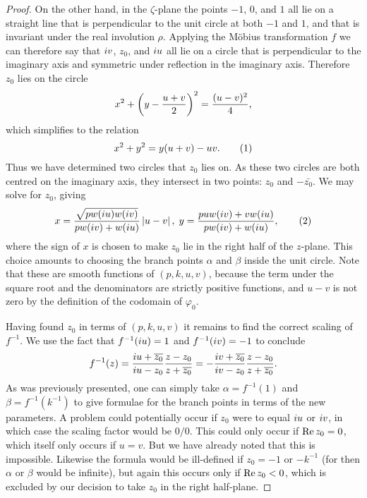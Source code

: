\begin{lem}
\begin{proof}
On the other hand, in the $ζ$-plane the points $-1$, $0$, and $1$ all lie on a straight line that is perpendicular to the unit circle at both $-1$ and $1$, and that is invariant under the real involution $ρ$. Applying the Möbius transformation $f$ we can therefore say that $i v$, $z_0$, and $i u$ all lie on a circle that is perpendicular to the imaginary axis and symmetric under reflection in the imaginary axis. Therefore $z_0$ lies on the circle
\[
x^2 + \left( y - \frac{u+v}{2} \right)^2 = \frac{(u-v)^2}{4},
\]
which simplifies to the relation
\[
x^2 + y^2 = y(u+v) - uv. \labelthis{eqn:z_0_circle}
\]
Thus we have determined two circles that $z_0$ lies on. As these two circles are both centred on the imaginary axis, they intersect in two points: $z_0$ and $-\bar{z_0}$. We may solve for $z_0$, giving
\[
x = \frac{\sqrt{pw(\iu u)w(\iu v)}}{pw(\iu v) + w(\iu u)} \abs{u-v},\; y = \frac{puw(\iu v) + vw(\iu u)}{pw(\iu v) + w(\iu u)},
\labelthis{eqn:formula xy}
\]
where the sign of $x$ is chosen to make $z_0$ lie in the right half of the $z$-plane. This choice amounts to choosing the branch points $α$ and $β$ inside the unit circle. Note that these are smooth functions of $(p,k,u,v)$, because the term under the square root and the denominators are strictly positive functions, and $u-v$ is not zero by the definition of the codomain of $φ_0$.

Having found $z_0$ in terms of $(p,k,u,v)$ it remains to find the correct scaling of $f^{-1}$. We use the fact that $f^{-1}(i u) = 1$ and $f^{-1}(i v) = -1$ to conclude
\[
f^{-1}(z)
=  \frac{i u + \overline{z_0}}{i u - z_0} \frac{z-z_0}{z + \overline{z_0}}
=  -\frac{i v + \overline{z_0}}{i v - z_0} \frac{z-z_0}{z + \overline{z_0}}.
\]
As was previously presented, one can simply take $α = f^{-1}(1)$ and $β = f^{-1}(k^{-1})$ to give formulae for the branch points in terms of the new parameters. A problem could potentially occur if $z_0$ were to equal $i u$ or $i v$, in which case the scaling factor would be $0/0$. This could only occur if $\operatorname{Re} z_0 = 0$, which itself only occurs if $u=v$. But we have already noted that this is impossible. Likewise the formula would be ill-defined if $z_0 = -1$ or $-k^{-1}$ (for then $α$ or $β$ would be infinite), but again this occurs only if $\operatorname{Re} z_0 < 0$, which is excluded by our decision to take $z_0$ in the right half-plane.


\end{proof}
\end{lem}
